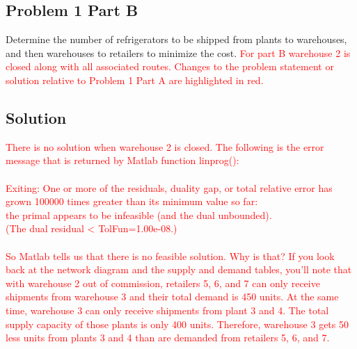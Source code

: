 \documentclass[../report/main.tex]{subfiles}
\begin{document}
\subsection*{Problem 1 Part B}
Determine the number of refrigerators to be shipped from plants to warehouses, and then warehouses to retailers to minimize the cost.  \textcolor{red}{For part B warehouse 2 is closed along with all associated routes.  Changes to the problem statement or solution relative to Problem 1 Part A are highlighted in red.}

\subsection*{Solution}
\textcolor{red}{There is no solution when warehouse 2 is closed.  The following is the error message that is returned by Matlab function linprog():\\\\Exiting: One or more of the residuals, duality gap, or total relative error has grown 100000 times greater than its minimum value so far:\\\indent the primal appears to be infeasible (and the dual unbounded).\\ \indent(The dual residual < TolFun=1.00e-08.)\\\\So Matlab tells us that there is no feasible solution.  Why is that?  If you look back at the network diagram and the supply and demand tables, you'll note that with warehouse 2 out of commission, retailers 5, 6, and 7 can only receive shipments from warehouse 3 and their total demand is 450 units.  At the same time, warehouse 3 can only receive shipments from plant 3 and 4.  The total supply capacity of those plants is only 400 units.  Therefore, warehouse 3 gets 50 less units from plants 3 and 4 than are demanded from retailers 5, 6, and 7.}
\end{document}
